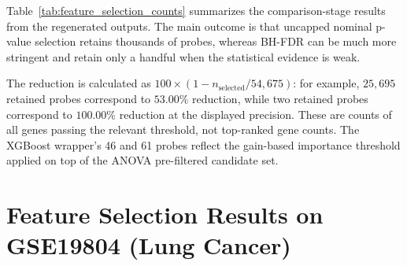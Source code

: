 Table~\ref{tab:feature_selection_counts} summarizes the comparison-stage results from the regenerated outputs. The main outcome is that uncapped nominal p-value selection retains thousands of probes, whereas BH-FDR can be much more stringent and retain only a handful when the statistical evidence is weak.

\begin{table}[H]
\centering
\caption{Feature-selection summary from the regenerated uncapped comparison runs.}
\label{tab:feature_selection_counts}
\end{table}

The reduction is calculated as $100 \times (1 - n_{\text{selected}}/54{,}675)$: for example, $25{,}695$ retained probes correspond to $53.00\%$ reduction, while two retained probes correspond to $100.00\%$ reduction at the displayed precision. These are counts of all genes passing the relevant threshold, not top-ranked gene counts. The XGBoost wrapper's 46 and 61 probes reflect the gain-based importance threshold applied on top of the ANOVA pre-filtered candidate set.

\section{Feature Selection Results on GSE19804 (Lung Cancer)}

